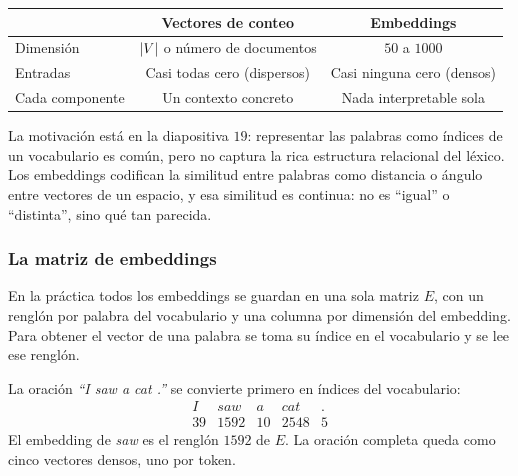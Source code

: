 \documentclass[11pt,letterpaper]{article}
\begin{document}
\begin{center}
\begin{tabular}{lcc}
    \toprule
    & \textbf{Vectores de conteo} & \textbf{Embeddings} \\
    \midrule
    Dimensión & $\left\lvert V \right\rvert$ o número de documentos & $50$ a $1000$ \\
    Entradas  & Casi todas cero (dispersos) & Casi ninguna cero (densos) \\
    Cada componente & Un contexto concreto & Nada interpretable sola \\
    \bottomrule
\end{tabular}
\end{center}

La motivación está en la diapositiva $19$: representar las palabras
como índices de un vocabulario es común, pero no captura la rica
estructura relacional del léxico. Los embeddings codifican la
similitud entre palabras como distancia o ángulo entre vectores de un
espacio, y esa similitud es continua: no es ``igual'' o ``distinta'',
sino qué tan parecida.

\subsubsection*{La matriz de embeddings}

En la práctica todos los embeddings se guardan en una sola matriz
$E$, con un renglón por palabra del vocabulario y una columna por
dimensión del embedding. Para obtener el vector de una palabra se toma
su índice en el vocabulario y se lee ese renglón.

\begin{ejemplo}
    La oración \textit{``I saw a cat .''} se convierte primero en
    índices del vocabulario:
    \[
        \begin{array}{ccccc}
            \textit{I} & \textit{saw} & \textit{a} & \textit{cat}
                & \textit{.} \\
            39 & 1592 & 10 & 2548 & 5
        \end{array}
    \]
    El embedding de \textit{saw} es el renglón $1592$ de $E$. La
    oración completa queda como cinco vectores densos, uno por token.
\end{ejemplo}
\end{document}
